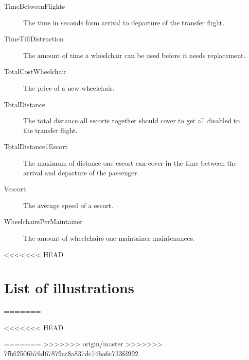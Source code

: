 \documentclass[a4paper, 11pt, notitlepage]{report}
\begin{document}
\begin{description}
  \item[TimeBetweenFlights] The time in seconds form arrival to departure of the transfer flight.
  \item[TimeTillDistruction] The amount of time a wheelchair can be used before it needs replacement.
  \item[TotalCostWheelchair] The price of a new wheelchair.
  \item[TotalDistance] The total distance all escorts together should cover to get all disabled to the transfer flight.
  \item[TotalDistance1Escort] The maximum of distance one escort can cover in the time between the arrival and departure of the passenger.
  \item[Vescort] The average speed of a escort.
  \item[WheelchairsPerMaintainer] The amount of wheelchairs one maintainer maintenances.
\end{description}

<<<<<<< HEAD
\chapter{List of illustrations}

=======
\listoffigures
<<<<<<< HEAD


=======
>>>>>>> origin/master
>>>>>>> 7fb62506b76d67879cc8a837dc74ba6c733fd992



\end{document}
